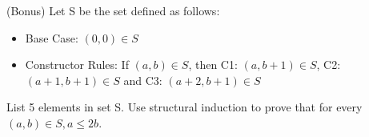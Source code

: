 \documentclass[solution, letterpaper]{cs20inclass}
\begin{document}
\problem(Bonus) Let S be the set defined as follows:
\begin{itemize}
\item Base Case: $(0,0) \in S$
\item Constructor Rules: If $(a,b)\in S$, then C1: $(a, b+1) \in S$, C2: $(a+1,b+1)\in S$ and C3: $(a+2, b+1)\in S$ 
\end{itemize}
\subproblem List 5 elements in set S.
\subproblem Use structural induction to prove that for every $(a,b)\in S, a\leq 2b$.
\end{document}
